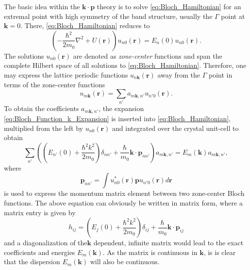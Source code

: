 The basic idea within the $\mathbf{k}\cdot\mathbf{p}$ theory \citet{kane_handbooksemiconductors_1982}
is to solve \ref{eq:Bloch_Hamiltonian} for an extremal point with
high symmetry of the band structure, usually the $\Gamma$ point at
$\mathbf{k}=0$. There, \ref{eq:Bloch_Hamiltonian} reduces to\begin{equation}
\left(-\frac{\hbar^{2}}{2m_{0}}\nabla^{2}+U(\mathbf{r})\right)u_{n0}(\mathbf{r})=E_{n}(0)u_{n0}(\mathbf{r}).\label{eq:zero_center_Bloch_Equation}\end{equation}
The solutions $u_{n0}(\mathbf{r})$ are denoted as \emph{zone-center}
functions and span the complete Hilbert space of all solutions to
\ref{eq:Bloch_Hamiltonian}. Therefore, one may express the lattice
periodic functions $u_{n\mathbf{k}}(\mathbf{r})$ away from the $\Gamma$
point in terms of the zone-center functions\begin{equation}
u_{m\mathbf{k}}(\mathbf{r})=\sum_{n'}a_{m\mathbf{k},n'}u_{n'0}(\mathbf{r}).\label{eq:Bloch_Function_k_Expansion}\end{equation}
To obtain the coefficients $a_{m\mathbf{k},n'}$, the expansion \ref{eq:Bloch_Function_k_Expansion}
is inserted into \ref{eq:Bloch_Hamiltonian}, multiplied from the
left by $u_{n0}(\mathbf{r})$ and integrated over the crystal unit-cell
to obtain\begin{equation}
\sum_{n'}\left(\left(E_{n'}(0)+\frac{\hbar^{2}k^{2}}{2m_{0}}\right)\delta_{nn'}+\frac{\hbar}{m_{0}}\mathbf{k}\cdot\mathbf{p}_{nn'}\right)a_{m\mathbf{k},n'}=E_{m}(\mathbf{k})a_{m\mathbf{k},n'},\end{equation}
where \begin{equation}
\mathbf{p}_{nn'}=\int u_{n0}^{*}(\mathbf{r})\mathbf{p}u_{n'0}(\mathbf{r})d\mathbf{r}\label{eq:momentum_matrix_element}\end{equation}
is used to express the momentum matrix element between two zone-center
Bloch functions. The above equation can obviously be written in matrix
form, where a matrix entry is given by\begin{equation}
h_{ij}=\left(E_{j}(0)+\frac{\hbar^{2}k^{2}}{2m_{0}}\right)\delta_{ij}+\frac{\hbar}{m_{0}}\mathbf{k}\cdot\mathbf{p}_{ij}\label{eq:k_dot_p_H_matrix}\end{equation}
and a diagonalization of the\textbf{$\mathbf{k}$} dependent, infinite
matrix would lead to the exact coefficients and energies $E_{m}(\mathbf{k})$.
As the matrix is continuous in \textbf{$\mathbf{k}$}, is is clear
that the dispersion $E_{m}(\mathbf{k})$ will also be continuous.

